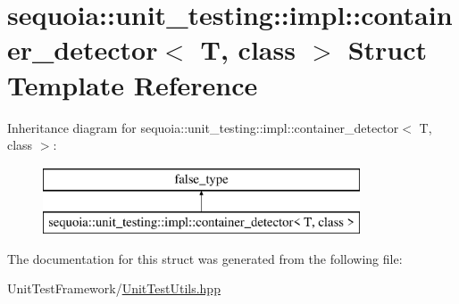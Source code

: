\hypertarget{structsequoia_1_1unit__testing_1_1impl_1_1container__detector}{}\section{sequoia\+::unit\+\_\+testing\+::impl\+::container\+\_\+detector$<$ T, class $>$ Struct Template Reference}
\label{structsequoia_1_1unit__testing_1_1impl_1_1container__detector}
Inheritance diagram for sequoia\+::unit\+\_\+testing\+::impl\+::container\+\_\+detector$<$ T, class $>$\+:\begin{figure}[H]
\begin{center}
\leavevmode
\includegraphics[height=2.000000cm]{structsequoia_1_1unit__testing_1_1impl_1_1container__detector}
\end{center}
\end{figure}


The documentation for this struct was generated from the following file\+:\begin{DoxyCompactItemize}
\item 
Unit\+Test\+Framework/\mbox{\hyperlink{_unit_test_utils_8hpp}{Unit\+Test\+Utils.\+hpp}}\end{DoxyCompactItemize}
